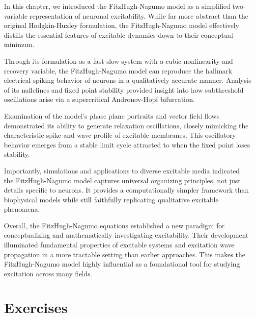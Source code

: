 In this chapter, we introduced the FitzHugh-Nagumo model as a simplified two-variable representation of neuronal excitability. While far more abstract than the original Hodgkin-Huxley formulation, the FitzHugh-Nagumo model effectively distills the essential features of excitable dynamics down to their conceptual minimum.

Through its formulation as a fast-slow system with a cubic nonlinearity and recovery variable, the FitzHugh-Nagumo model can reproduce the hallmark electrical spiking behavior of neurons in a qualitatively accurate manner. Analysis of its nullclines and fixed point stability provided insight into how subthreshold oscillations arise via a supercritical Andronov-Hopf bifurcation.

Examination of the model's phase plane portraits and vector field flows demonstrated its ability to generate relaxation oscillations, closely mimicking the characteristic spike-and-wave profile of excitable membranes. This oscillatory behavior emerges from a stable limit cycle attracted to when the fixed point loses stability.

Importantly, simulations and applications to diverse excitable media indicated the FitzHugh-Nagumo model captures universal organizing principles, not just details specific to neurons. It provides a computationally simpler framework than biophysical models while still faithfully replicating qualitative excitable phenomena.

Overall, the FitzHugh-Nagumo equations established a new paradigm for conceptualizing and mathematically investigating excitability. Their development illuminated fundamental properties of excitable systems and excitation wave propagation in a more tractable setting than earlier approaches. This makes the FitzHugh-Nagumo model highly influential as a foundational tool for studying excitation across many fields.

\section{Exercises}

